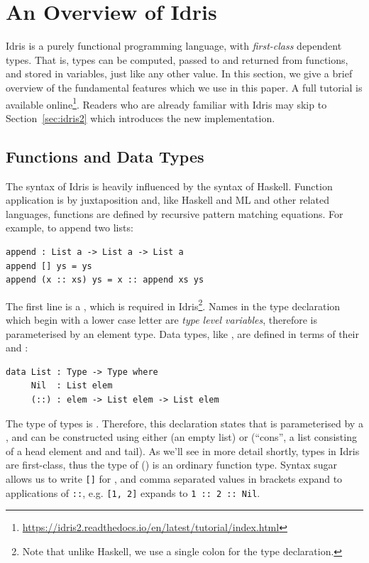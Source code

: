 \section{An Overview of Idris}

\label{sec:idris}

Idris is a purely functional programming language, with \emph{first-class}
dependent types. That is, types can be computed, passed to and returned from
functions, and stored in variables, just like any other value. In this section,
we give a brief overview of the fundamental features which we 
use in this paper. A full tutorial is available
online\footnote{\url{https://idris2.readthedocs.io/en/latest/tutorial/index.html}}.
Readers who are already familiar with Idris may skip to Section~\ref{sec:idris2}
which introduces the new implementation.

\subsection{Functions and Data Types}

\label{sec:typevars}

The syntax of Idris is heavily influenced by the syntax of Haskell. Function
application is by juxtaposition and, like Haskell and ML and other related
languages, functions are defined by recursive pattern matching equations. For
example, to append two lists:

\begin{lstlisting}
append : List a -> List a -> List a
append [] ys = ys
append (x :: xs) ys = x :: append xs ys
\end{lstlisting}

The first line is a , which is required in
Idris\footnote{Note that unlike Haskell, we use a single colon for the type
declaration.}. Names in the type declaration which begin with a lower case
letter are \emph{type level variables}, therefore  is parameterised
by an element type.
Data types, like , are defined in terms of their  and :

\begin{lstlisting}
data List : Type -> Type where
     Nil  : List elem
     (::) : elem -> List elem -> List elem
\end{lstlisting}

The type of types is .
Therefore, this declaration states that  is parameterised by a
, and can be constructed using either  (an empty list) or
\TC{::} (``cons'', a list consisting of a head element and and tail).
%
As we'll see in more detail shortly, types in Idris are first-class, thus
the type of  () is an ordinary function type.
Syntax sugar allows us to write \texttt{[]} for , and comma separated
values in brackets expand to applications of \texttt{::}, e.g. \texttt{[1, 2]}
expands to \texttt{1 :: 2 :: Nil}.

